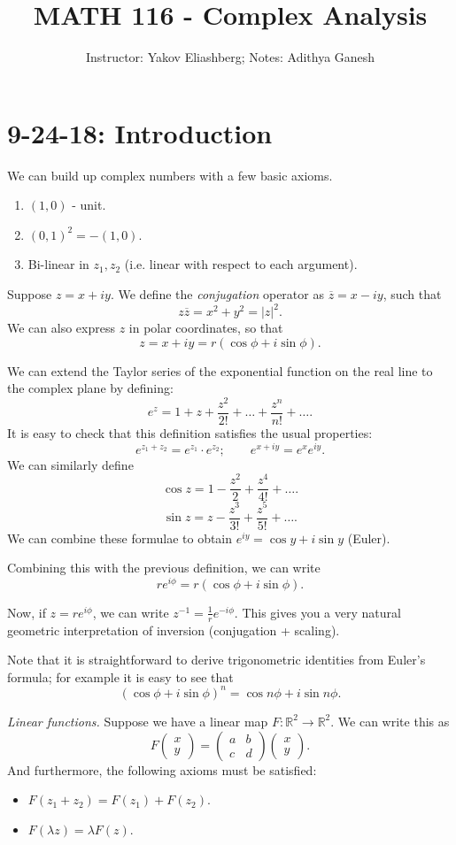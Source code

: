 \documentclass[12pt]{article}
\title{MATH 116 - Complex Analysis}
\author{Instructor: Yakov Eliashberg; Notes: Adithya Ganesh}
\newcommand{\RR}{\mathbb{R}}
\newcommand{\ol}{\overline}
\newcommand*{\mat}[1]{\begin{pmatrix}#1\end{pmatrix}}
\newcommand*{\mat}[1]{\begin{pmatrix}#1\end{pmatrix}}
\begin{document}
\maketitle

\tableofcontents

\section{9-24-18: Introduction}
We can build up complex numbers with a few basic axioms.

\begin{enumerate}
  \item $(1, 0)$ - unit.
  \item $(0, 1)^2 = - (1, 0)$.
  \item Bi-linear in $z_1, z_2$ (i.e. linear with respect to each argument).
\end{enumerate}

Suppose $z = x+iy$.  We define the {\it conjugation} operator as $\ol{z} = x - iy$, such that
\[
  z \ol{z} = x^2 + y^2 = |z|^2.
\]
We can also express $z$ in polar coordinates, so that
\[
  z = x + iy = r(\cos \phi + i \sin \phi).
\]

We can extend the Taylor series of the exponential function on the real line to the complex plane by defining:
\[
  e^z = 1 + z + \frac{z^2}{2!} + \dots + \frac{z^n}{n!} + \dots.
\]
It is easy to check that this definition satisfies the usual properties:
\[
  e^{z_1 + z_2} = e^{z_1} \cdot e^{z_2}; \qquad e^{x + iy} = e^x e^{iy}.
\]
  We can similarly define
  \[
    \cos z = 1 - \frac{z^2}{2} + \frac{z^4}{4!} + \dots.
  \]
  \[
    \sin z = z - \frac{z^3}{3!} + \frac{z^5}{5!} + \dots.
  \]
  We can combine these formulae to obtain $e^{iy} = \cos y + i \sin y$ (Euler).

  Combining this with the previous definition, we can write
  \[
    r e^{i \phi} = r (\cos \phi + i \sin \phi).
  \]

  Now, if $z = re^{i \phi}$, we can write $z^{-1} = \frac{1}{r} e^{-i \phi}$.  This gives you a very natural geometric interpretation of inversion (conjugation + scaling).

  Note that it is straightforward to derive trigonometric identities from Euler's formula; for example it is easy to see that
  \[
    (\cos \phi + i \sin \phi)^n = \cos n \phi + i \sin n \phi.
  \]

  {\it Linear functions.}  Suppose we have a linear map $F: \RR^2 \to \RR^2$.  We can write this as
  \[
    F \mat{x \\ y} = \mat{a & b \\ c & d} \mat{x \\ y}.
  \]
  And furthermore, the following axioms must be satisfied:
  \begin{itemize}
    \item $F(z_1 + z_2) = F(z_1) + F(z_2)$.
    \item $F(\lambda z) = \lambda F(z)$.
  \end{itemize}
\end{document}
